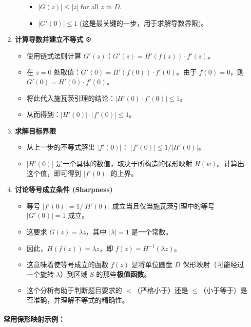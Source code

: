 \begin{enumerate}
\begin{itemize}
		\begin{itemize}
			\item $|G(z)| \le |z|$ for all $z$ in $D$.
			\item \textbf{$|G'(0)| \le 1$} (这是最关键的一步，用于求解导数界限)。
		\end{itemize}
	\end{itemize}
	\item \textbf{计算导数并建立不等式} ⚙️
	\begin{itemize}
		\item 使用链式法则计算 $G'(z)$：$G'(z) = H'(f(z)) \cdot f'(z)$。
		\item 在 $z=0$ 处取值：$G'(0) = H'(f(0)) \cdot f'(0)$。由于 $f(0)=0$，则 $G'(0) = H'(0) \cdot f'(0)$。
		\item 将此代入施瓦茨引理的结论：$|H'(0) \cdot f'(0)| \le 1$。
		\item 从而得到：$|H'(0)| \cdot |f'(0)| \le 1$。
	\end{itemize}
	\item \textbf{求解目标界限} 🎯
	\begin{itemize}
		\item 从上一步的不等式解出 $|f'(0)|$：
$|f'(0)| \le 1 / |H'(0)|$。
		\item $|H'(0)|$ 是一个具体的数值，取决于所构造的保形映射 $H(w)$。计算出这个值，即可得到 $|f'(0)|$ 的上界。
	\end{itemize}
	\item \textbf{讨论等号成立条件 (Sharpness)} 🧐
	\begin{itemize}
		\item 等号 $|f'(0)| = 1 / |H'(0)|$ 成立当且仅当施瓦茨引理中的等号 $|G'(0)| = 1$ 成立。
		\item 这要求 $G(z) = \lambda z$，其中 $|\lambda|=1$ 是一个常数。
		\item 因此，$H(f(z)) = \lambda z$，即 $f(z) = H^{-1}(\lambda z)$。
		\item 这意味着使等号成立的函数 $f(z)$ 是将单位圆盘 $D$ 保形映射（可能经过一个旋转 $\lambda$）到区域 $S$ 的那些\textbf{极值函数}。
		\item 这个分析有助于判断题目要求的 $<$（严格小于）还是 $\le$（小于等于）是否准确，并理解不等式的精确性。
	\end{itemize}
\end{enumerate}


\paragraph{常用保形映射示例：}

